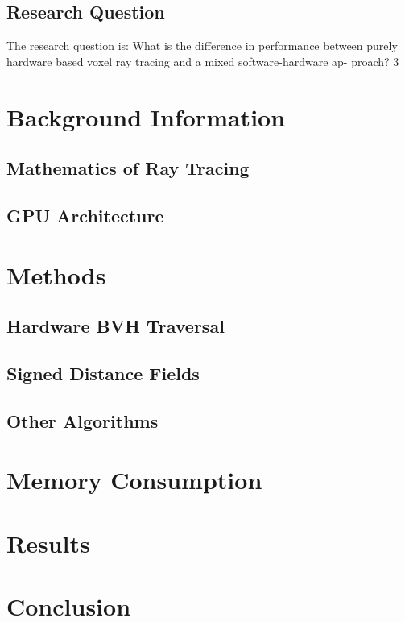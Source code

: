 \documentclass[12pt]{article}
\begin{document}
\subsection{Research Question}

The research question is: What is the difference in performance between
purely hardware based voxel ray tracing and a mixed software-hardware ap-
proach?
3



\section{Background Information}
\subsection{Mathematics of Ray Tracing}
\subsection{GPU Architecture}

\section{Methods}
\subsection{Hardware BVH Traversal}
\subsection{Signed Distance Fields}
\subsection{Other Algorithms}

\section{Memory Consumption}

\section{Results}

\section{Conclusion}
\end{document}
